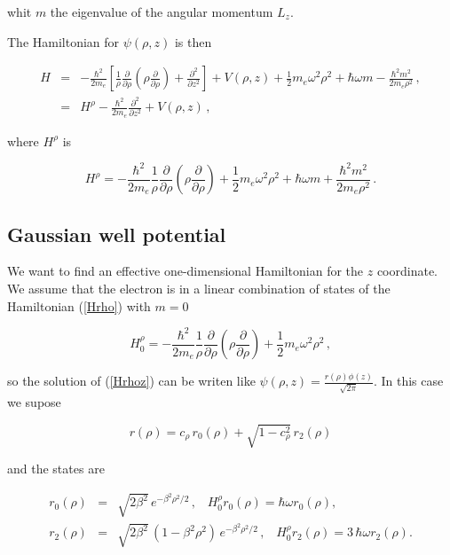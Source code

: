 \documentclass[a4paper,10pt]{article}
\begin{document}
\noindent whit $m$ the eigenvalue of the angular momentum $L_z$.

The Hamiltonian for $\psi(\rho,z)$ is then

\begin{eqnarray}\label{Hrhoz}
H &=& -\frac{\hbar^2}{2 m_e}\left[\frac{1}{\rho}\frac{\partial}{\partial \rho}\left(\rho \frac{\partial}{\partial \rho} \right)
 + \frac{\partial^2}{\partial z^2} \right] + V(\rho, z) + \frac{1}{2} m_e \omega^2 \rho^2 + \hbar \omega m - \frac{\hbar^2 m^2}{2 m_e \rho^2}\,,\\
  &=& H^{\rho} - \frac{\hbar^2}{2 m_e}\frac{\partial^2}{\partial z^2} + V(\rho, z)\, ,
\end{eqnarray}

\noindent where $H^{\rho}$ is

\begin{equation}\label{Hrho}
  H^{\rho} = -\frac{\hbar^2}{2 m_e} \frac{1}{\rho}\frac{\partial}{\partial \rho}\left(\rho \frac{\partial}{\partial \rho} \right) +
  \frac{1}{2} m_e \omega^2 \rho^2 + \hbar \omega m + \frac{\hbar^2 m^2}{2 m_e \rho^2}\,.
\end{equation}

\subsection*{Gaussian well potential}

We want to find an effective one-dimensional Hamiltonian for the $z$ coordinate. We assume that
the electron is in a linear combination of states of the Hamiltonian (\ref{Hrho}) with $m = 0$

\begin{equation}
  H_{0}^{\rho} = -\frac{\hbar^2}{2 m_e} \frac{1}{\rho}\frac{\partial}{\partial \rho}\left(\rho \frac{\partial}{\partial \rho} \right) +
  \frac{1}{2} m_e \omega^2 \rho^2 \, ,
\end{equation}

\noindent so the solution of (\ref{Hrhoz})
can be writen like $\psi(\rho, z) = \frac{r(\rho)\phi(z)}{\sqrt{2\pi}}$. In this case we supose

\begin{equation}
  r(\rho) = c_{\rho}\, r_0(\rho) + \sqrt{1 - c_{\rho}^2}\, r_2(\rho)
\end{equation}

\noindent and the states are

\begin{eqnarray}
  r_0(\rho) &=& \sqrt{2 \beta^2}\, e^{-\beta^2 \rho^2/2}\,,\,\,\,\,\,H_{0}^{\rho} r_0(\rho) = \hbar \omega r_0(\rho) ,\\
  r_2(\rho) &=& \sqrt{2 \beta^2}\, \left(1 - \beta^2 \rho^2 \right)\, e^{-\beta^2 \rho^2/2}\,,\,\,\,\,\,H_{0}^{\rho} r_2(\rho) = 3\,\hbar \omega r_2(\rho).
\end{eqnarray}
\end{document}
